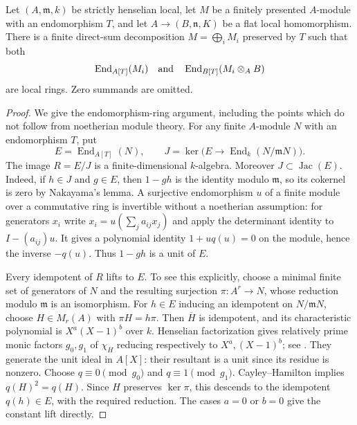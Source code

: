 \begin{proposition}
\label{A:fpqc-indecomposable-basechange}
Let $(A,\mathfrak m,k)$ be strictly henselian local, let $M$ be a
finitely presented $A$-module with an endomorphism $T$, and let
$A\to(B,\mathfrak n,K)$ be a flat local homomorphism.
There is a finite direct-sum decomposition $M=\bigoplus_i M_i$
preserved by $T$ such that both
\[
 \operatorname{End}_{A[T]}(M_i)\quad\hbox{and}\quad
 \operatorname{End}_{B[T]}(M_i\otimes_A B)
\]
are local rings.  Zero summands are omitted.
\end{proposition}
\begin{proof}
We give the endomorphism-ring argument, including the points which
do not follow from noetherian module theory.  For any finite
$A$-module $N$ with an endomorphism $T$, put
\[
 E=\operatorname{End}_{A[T]}(N),\qquad
 J=\ker\bigl(E\longrightarrow\operatorname{End}_k(N/\mathfrak mN)\bigr).
\]
The image $R=E/J$ is a finite-dimensional $k$-algebra.
Moreover $J\subset\operatorname{Jac}(E)$.  Indeed, if $h\in J$
and $g\in E$, then $1-gh$ is the identity modulo $\mathfrak m$,
so its cokernel is zero by Nakayama's lemma.  A surjective
endomorphism $u$ of a finite module over a commutative ring is
invertible without a noetherian assumption: for generators $x_i$
write $x_i=u(\sum_j a_{ij}x_j)$ and apply the determinant identity
to $I-(a_{ij})u$.  It gives a polynomial identity
$1+u q(u)=0$ on the module, hence the inverse $-q(u)$.
Thus $1-gh$ is a unit of $E$.

Every idempotent of $R$ lifts to $E$.  To see this explicitly,
choose a minimal finite set of generators of $N$ and the resulting
surjection $\pi:A^r\to N$, whose reduction modulo $\mathfrak m$
is an isomorphism.  For $h\in E$ inducing an idempotent on
$N/\mathfrak mN$, choose $H\in M_r(A)$ with $\pi H=h\pi$.
Then $\overline H$ is idempotent, and its characteristic polynomial
is $X^a(X-1)^b$ over $k$.  Henselian factorization gives relatively
prime monic factors $g_0,g_1$ of $\chi_H$ reducing respectively
to $X^a,(X-1)^b$; see
\cite[Lemma 10.153.3(3)--(4)]{StacksHenselFactorSolution}.
They generate the unit ideal in $A[X]$: their resultant is a unit
since its residue is nonzero.  Choose $q\equiv0\pmod{g_0}$ and
$q\equiv1\pmod{g_1}$.  Cayley--Hamilton implies
$q(H)^2=q(H)$.  Since $H$ preserves $\ker\pi$, this descends to
the idempotent $q(h)\in E$, with the required reduction.  The
cases $a=0$ or $b=0$ give the constant lift directly.


\end{proof}
